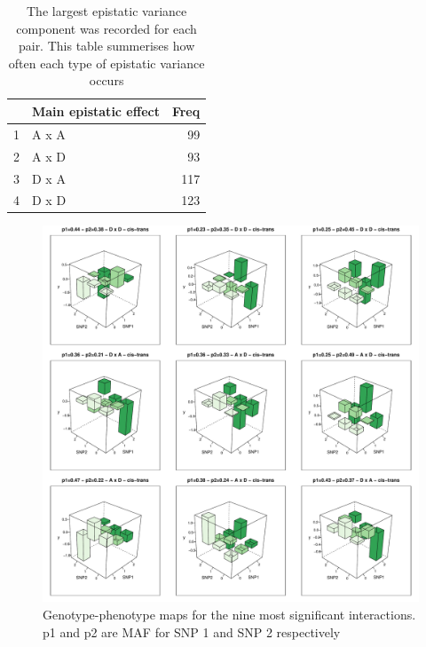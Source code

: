 \documentclass[paper=a4, fontsize=11pt]{scrartcl}	%
\numberwithin{equation}{section}									%
\numberwithin{figure}{section}										%
\numberwithin{table}{section}										%
\begin{document}
\begin{table}[ht]
	\centering
	\begin{tabular}{rlr}
		\hline
		& Main epistatic effect & Freq \\ 
		\hline
		1 & A x A &  99 \\ 
		2 & A x D &  93 \\ 
		3 & D x A & 117 \\ 
		4 & D x D & 123 \\ 
		\hline
	\end{tabular}
	\caption{The largest epistatic variance component was recorded for each pair. This table summerises how often each type of epistatic variance occurs}
	\label{tab:vc}
\end{table}

\begin{figure}[p]
	\centering
	\includegraphics[width=15cm]{images/3dplots}
	\caption{Genotype-phenotype maps for the nine most significant interactions. p1 and p2 are MAF for SNP 1 and SNP 2 respectively}
	\label{fig:3dplots}
\end{figure}
\end{document}

